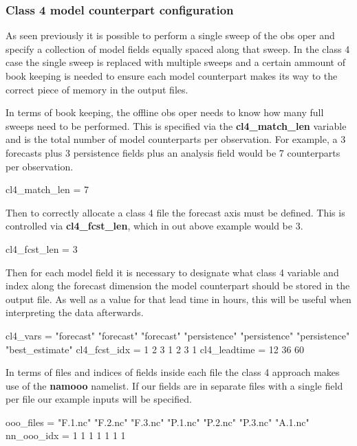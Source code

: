 \documentclass[../tex_main/NEMO_manual]{subfiles}
\begin{document}
\subsubsection{Class 4 model counterpart configuration}

As seen previously it is possible to perform a single sweep of the obs oper and
specify a collection of model fields equally spaced along that sweep.
In the class 4 case the single sweep is replaced with multiple sweeps and
a certain ammount of book keeping is needed to ensure each model counterpart makes its way to
the correct piece of memory in the output files.

\noindent
\linebreak
In terms of book keeping, the offline obs oper needs to know how many full sweeps need to be performed.
This is specified via the \textbf{cl4\_match\_len} variable and
is the total number of model counterparts per observation.
For example, a 3 forecasts plus 3 persistence fields plus an analysis field would be 7 counterparts per observation.

\begin{forlines}
   cl4_match_len = 7
\end{forlines}

Then to correctly allocate a class 4 file the forecast axis must be defined.
This is controlled via \textbf{cl4\_fcst\_len}, which in out above example would be 3.

\begin{forlines}
   cl4_fcst_len = 3
\end{forlines}

Then for each model field it is necessary to designate what class 4 variable and index along
the forecast dimension the model counterpart should be stored in the output file.
As well as a value for that lead time in hours, this will be useful when interpreting the data afterwards. 

\begin{forlines}
   cl4_vars = "forecast" "forecast" "forecast" "persistence" "persistence"
              "persistence" "best_estimate"
   cl4_fcst_idx = 1 2 3 1 2 3 1
   cl4_leadtime = 12 36 60 
\end{forlines}

In terms of files and indices of fields inside each file the class 4 approach makes use of
the \textbf{namooo} namelist.
If our fields are in separate files with a single field per file our example inputs will be specified.

\begin{forlines}
   ooo_files = "F.1.nc" "F.2.nc" "F.3.nc" "P.1.nc" "P.2.nc" "P.3.nc" "A.1.nc"
   nn_ooo_idx = 1 1 1 1 1 1 1
\end{forlines}
\end{document}
